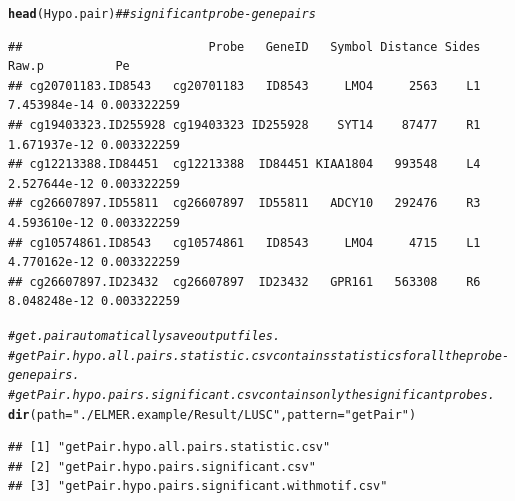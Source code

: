 \documentclass{article}\usepackage[]{graphicx}\usepackage[]{color}
\makeatletter
\newcommand{\hlstr}[1]{\textcolor[rgb]{0.192,0.494,0.8}{#1}}%
\newcommand{\hlcom}[1]{\textcolor[rgb]{0.678,0.584,0.686}{\textit{#1}}}%
\newcommand{\hlstd}[1]{\textcolor[rgb]{0.345,0.345,0.345}{#1}}%
\newcommand{\hlkwc}[1]{\textcolor[rgb]{0.333,0.667,0.333}{#1}}%
\newcommand{\hlkwd}[1]{\textcolor[rgb]{0.737,0.353,0.396}{\textbf{#1}}}%
\newenvironment{kframe}{%
 \def\at@end@of@kframe{}%
 \ifinner\ifhmode%
  \def\at@end@of@kframe{\end{minipage}}%
  \begin{minipage}{\columnwidth}%
 \fi\fi%
 \def\FrameCommand##1{\hskip\@totalleftmargin \hskip-\fboxsep
 \colorbox{shadecolor}{##1}\hskip-\fboxsep
     \hskip-\linewidth \hskip-\@totalleftmargin \hskip\columnwidth}%
 \MakeFramed {\advance\hsize-\width
   \@totalleftmargin\z@ \linewidth\hsize
   \@setminipage}}%
 {\par\unskip\endMakeFramed%
 \at@end@of@kframe}
\newenvironment{knitrout}{}{} %
\makeatother
\begin{document}
\begin{knitrout}
\begin{kframe}
{\ttfamily\noindent\itshape\color{messagecolor}{\#\# Calculate empirical P value.}}\begin{alltt}
\hlkwd{head}\hlstd{(Hypo.pair)}  \hlcom{## significant probe-gene pairs}
\end{alltt}
\begin{verbatim}
##                          Probe   GeneID   Symbol Distance Sides        Raw.p          Pe
## cg20701183.ID8543   cg20701183   ID8543     LMO4     2563    L1 7.453984e-14 0.003322259
## cg19403323.ID255928 cg19403323 ID255928    SYT14    87477    R1 1.671937e-12 0.003322259
## cg12213388.ID84451  cg12213388  ID84451 KIAA1804   993548    L4 2.527644e-12 0.003322259
## cg26607897.ID55811  cg26607897  ID55811   ADCY10   292476    R3 4.593610e-12 0.003322259
## cg10574861.ID8543   cg10574861   ID8543     LMO4     4715    L1 4.770162e-12 0.003322259
## cg26607897.ID23432  cg26607897  ID23432   GPR161   563308    R6 8.048248e-12 0.003322259
\end{verbatim}
\begin{alltt}
\hlcom{# get.pair automatically save output files. }
\hlcom{#getPair.hypo.all.pairs.statistic.csv contains statistics for all the probe-gene pairs.}
\hlcom{#getPair.hypo.pairs.significant.csv contains only the significant probes.}
\hlkwd{dir}\hlstd{(}\hlkwc{path} \hlstd{=} \hlstr{"./ELMER.example/Result/LUSC"}\hlstd{,} \hlkwc{pattern} \hlstd{=} \hlstr{"getPair"}\hlstd{)}
\end{alltt}
\begin{verbatim}
## [1] "getPair.hypo.all.pairs.statistic.csv"        
## [2] "getPair.hypo.pairs.significant.csv"          
## [3] "getPair.hypo.pairs.significant.withmotif.csv"
\end{verbatim}
\end{kframe}
\end{knitrout}
\end{document}
